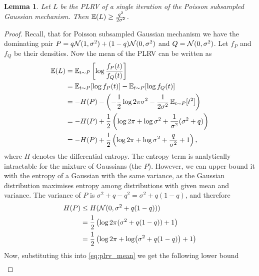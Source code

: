 \documentclass{article}
\theoremstyle{plain}
\newtheorem{lemma}[theorem]{Lemma}
\theoremstyle{definition}
\theoremstyle{remark}
\begin{document}
\begin{lemma}\label{lemma:subsampled-gauss-mech-prlv-exp-lower-bound}
    Let $L$ be the PLRV of a single iteration of the Poisson subsampled Gaussian mechanism. 
    Then $\operatorname{\mathbb{E}}(L) \geq \frac{q^2}{2\sigma^2}$.
\end{lemma}
\begin{proof}
    Recall, that for Poisson subsampled Gaussian mechanism we have the dominating pair 
    $P = q \mathcal{N}(1, \sigma^2) + (1-q) \mathcal{N}(0, \sigma^2)$ 
    and $Q = \mathcal{N}(0, \sigma^2)$. Let $f_P$ and $f_Q$ be their densities. Now the mean of the PLRV can be written as 
    \begin{equation}
        \begin{split}
            \operatorname{\mathbb{E}}(L) &= \operatorname{\mathbb{E}}_{t \sim P}\left[ \log \frac{f_P(t)}{f_Q(t)} \right] \\
                &= \operatorname{\mathbb{E}}_{t \sim P}[\log f_P(t)] - \operatorname{\mathbb{E}}_{t \sim P}[\log f_Q(t)] \\
                &= -H(P) - \left( -\frac{1}{2}\log 2\pi\sigma^2 -\frac{1}{2\sigma^2}\operatorname{\mathbb{E}}_{t \sim P}[t^2] \right)\\
                &= -H(P) + \frac{1}{2}\left( \log 2\pi + \log \sigma^2 + \frac{1}{\sigma^2}(\sigma^2+q) \right) \\
                &= -H(P) + \frac{1}{2}\left( \log 2\pi + \log \sigma^2 + \frac{q}{\sigma^2} + 1 \right), \label{eq:plrv_mean}
        \end{split}
    \end{equation}
    where $H$ denotes the differential entropy. The entropy term is analytically intractable for the mixture 
    of Gaussians (the $P$). However, we can upper bound it with the entropy of a Gaussian with the same
    variance, as the Gaussian distribution maximises entropy among distributions with given mean and variance. 
    The variance of $P$ is $\sigma^2+q-q^2=\sigma^2 + q(1-q)$, and therefore
    \begin{equation}
        \begin{split}
            H(P) 
                &\leq H(\mathcal{N}(0, \sigma^2 + q(1-q)))  \\
                &= \frac{1}{2} \left(\log 2\pi(\sigma^2 + q(1-q)) + 1 \right) \\
                &= \frac{1}{2} \left(\log 2\pi + \log(\sigma^2 + q(1-q)) + 1 \right)
        \end{split}
    \end{equation}
    Now, substituting this into \eqref{eq:plrv_mean} we get the following lower bound
    \begin{align}

\end{align}
\end{proof}
\end{document}

